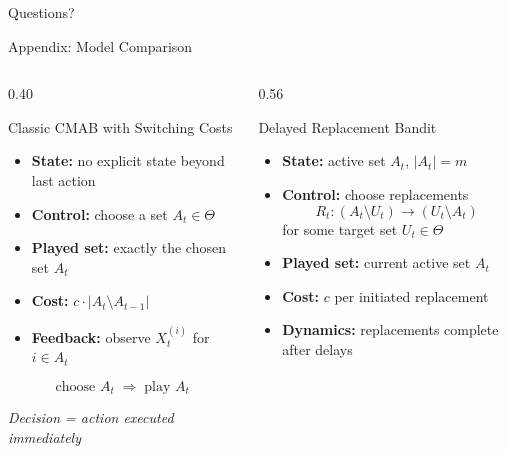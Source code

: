 \documentclass[10pt,aspectratio=169]{beamer}
\begin{document}
\begin{frame}
    \centering
    \vfill
    {\LARGE Questions?}
    \vfill
\end{frame}

\appendix

\begin{frame}{Appendix: Model Comparison}

\small

\begin{columns}[T,onlytextwidth]
    \begin{column}{0.40\textwidth}
        \begin{block}{Classic CMAB with Switching Costs}
        \begin{itemize}
            \item \textbf{State:} no explicit state beyond last action
            \item \textbf{Control:} choose a set \(A_t \in \Theta\)
            \item \textbf{Played set:} exactly the chosen set \(A_t\)
            \item \textbf{Cost:} \(c\cdot |A_t \setminus A_{t-1}|\)
            \item \textbf{Feedback:} observe \(X_t^{(i)}\) for \(i\in A_t\)
        \end{itemize}
        \end{block}

        \vspace{0.5em}
        \begin{center}
        \[
        \boxed{\text{choose } A_t}
        \;\Longrightarrow\;
        \boxed{\text{play } A_t}
        \]
        \end{center}

        \begin{center}
        \emph{Decision = action executed immediately}
        \end{center}
    \end{column}

    \begin{column}{0.56\textwidth}
        \begin{block}{Delayed Replacement Bandit}
        \begin{itemize}
            \item \textbf{State:} active set \(A_t\), \(|A_t|=m\)
            \item \textbf{Control:} choose replacements
            \[
            R_t:(A_t\setminus U_t)\to (U_t\setminus A_t)
            \]
            for some target set \(U_t\in\Theta\)
            \item \textbf{Played set:} current active set \(A_t\)
            \item \textbf{Cost:} \(c\) per initiated replacement
            \item \textbf{Dynamics:} replacements complete after delays
        \end{itemize}
        \end{block}


\end{column}
\end{columns}
\end{frame}
\end{document}
